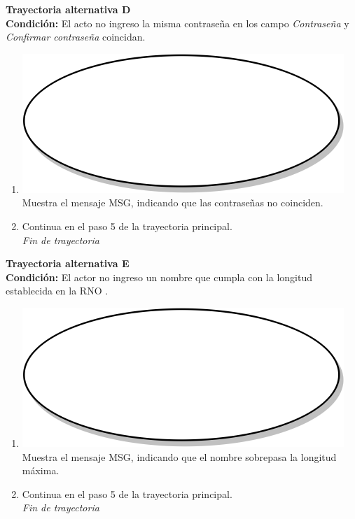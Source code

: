 \textbf{Trayectoria alternativa D} \label{cu2_ta_d}\\
\textbf{Condición:} El acto no ingreso la misma contraseña en los campo \textit{Contraseña} y \textit{Confirmar contraseña} coincidan.\\
 \begin{enumerate}[label=D\arabic*]
    \item {\includegraphics[scale=.05]{Capitulo3/img/proceso.png} Muestra el mensaje MSG, indicando que las contraseñas no coinciden.}
    \item {Continua en el paso 5 de la trayectoria principal.} \\
    \textit{Fin de trayectoria} \\
\end{enumerate}

\textbf{Trayectoria alternativa E} \label{cu2_ta_e}\\
\textbf{Condición:} El actor no ingreso un nombre que cumpla con la longitud establecida en la RNO .\\
 \begin{enumerate}[label=E\arabic*]
    \item {\includegraphics[scale=.05]{Capitulo3/img/proceso.png} Muestra el mensaje MSG, indicando que el nombre sobrepasa la longitud máxima.}
    \item {Continua en el paso 5 de la trayectoria principal.} \\
    \textit{Fin de trayectoria} \\
\end{enumerate}

